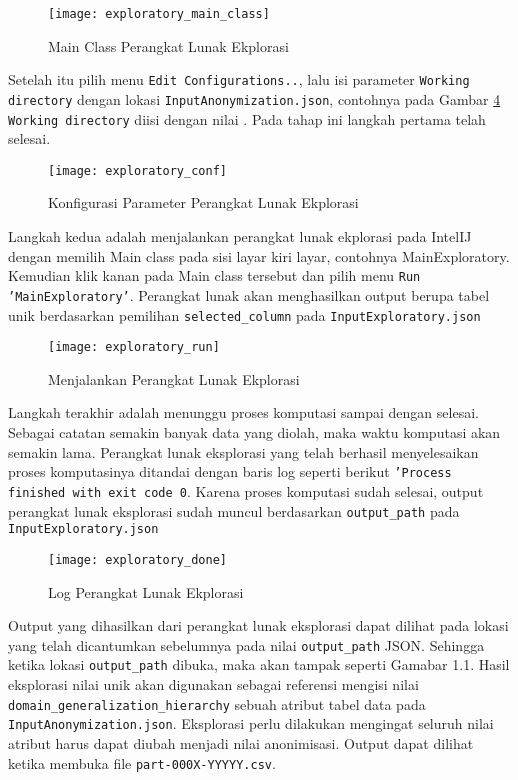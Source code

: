 \begin{figure}[H]
	\centering
	\texttt{[image: exploratory\_main\_class]}
	\caption{Main Class Perangkat Lunak Ekplorasi}
	\label{fig:pertama1}
\end{figure}

Setelah itu pilih menu \texttt{Edit Configurations..}, lalu isi parameter \texttt{Working directory} dengan lokasi \texttt{InputAnonymization.json}, contohnya pada Gambar \ref{fig:pertama2} \texttt{Working directory} diisi dengan nilai . Pada tahap ini langkah pertama telah selesai.

\begin{figure}[H]
	\centering
	\texttt{[image: exploratory\_conf]}
	\caption{Konfigurasi Parameter Perangkat Lunak Ekplorasi}
	\label{fig:pertama2}
\end{figure}

Langkah kedua adalah menjalankan perangkat lunak ekplorasi pada IntelIJ dengan memilih Main class pada sisi layar kiri layar, contohnya MainExploratory. Kemudian klik kanan pada Main class tersebut dan pilih menu \texttt{Run 'MainExploratory'}. Perangkat lunak akan menghasilkan output berupa tabel unik berdasarkan pemilihan \texttt{selected\_column} pada \texttt{InputExploratory.json}

\begin{figure}[H]
	\centering
	\texttt{[image: exploratory\_run]}
	\caption{Menjalankan Perangkat Lunak Ekplorasi}
	\label{fig:pertama2}
\end{figure}

Langkah terakhir adalah menunggu proses komputasi sampai dengan selesai. Sebagai catatan semakin banyak data yang diolah, maka waktu komputasi akan semakin lama. Perangkat lunak eksplorasi yang telah berhasil menyelesaikan proses komputasinya ditandai dengan baris log seperti berikut \texttt{'Process finished with exit code 0}. Karena proses komputasi sudah selesai, output perangkat lunak eksplorasi sudah muncul berdasarkan \texttt{output\_path} pada \texttt{InputExploratory.json}

\begin{figure}[H]
	\centering
	\texttt{[image: exploratory\_done]}
	\caption{Log Perangkat Lunak Ekplorasi}
	\label{fig:pertama2}
\end{figure}

Output yang dihasilkan dari perangkat lunak eksplorasi dapat dilihat pada lokasi yang telah dicantumkan sebelumnya pada nilai \texttt{output\_path} JSON.  Sehingga ketika lokasi \texttt{output\_path} dibuka, maka akan tampak seperti Gamabar 1.1. Hasil eksplorasi nilai unik akan digunakan sebagai referensi mengisi nilai \texttt{domain\_generalization\_hierarchy} sebuah atribut tabel data pada \texttt{InputAnonymization.json}. Eksplorasi perlu dilakukan mengingat seluruh nilai atribut harus dapat diubah menjadi nilai anonimisasi. Output dapat dilihat ketika membuka file \texttt{part-000X-YYYYY.csv}.

